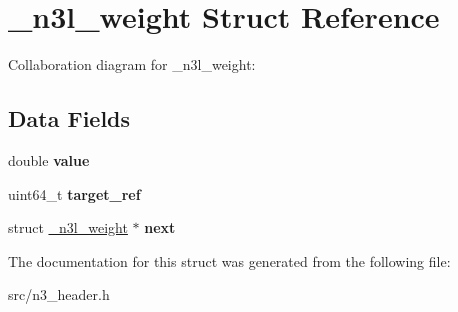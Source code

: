\hypertarget{struct__n3l__weight}{}\section{\+\_\+n3l\+\_\+weight Struct Reference}
\label{struct__n3l__weight}


Collaboration diagram for \+\_\+n3l\+\_\+weight\+:
\subsection*{Data Fields}
\begin{DoxyCompactItemize}
\item 
\mbox{\label{struct__n3l__weight_a1d1ebc5e04ba1dd26094993dd94aa710}} 
double {\bfseries value}
\item 
\mbox{\label{struct__n3l__weight_ac5094b52f09a092ffb1cdc4cc594f38f}} 
uint64\+\_\+t {\bfseries target\+\_\+ref}
\item 
\mbox{\label{struct__n3l__weight_adf96faae4820538377678c82ec96d48e}} 
struct \mbox{\hyperlink{struct__n3l__weight}{\+\_\+n3l\+\_\+weight}} $\ast$ {\bfseries next}
\end{DoxyCompactItemize}


The documentation for this struct was generated from the following file\+:\begin{DoxyCompactItemize}
\item 
src/n3\+\_\+header.\+h\end{DoxyCompactItemize}
